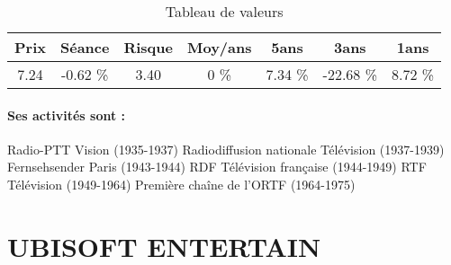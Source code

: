 \documentclass[11pt,a4paper]{report}%
\begin{document}
\begin{table}[H]
  \centering
    \begin{tabular}{|c|c|c|c|c|c|c|}
    \hline
    Prix & Séance & Risque  & Moy/ans & 5ans & 3ans & 1ans \\
    \hline
    7.24 &    -0.62 \%    & 3.40 & 0 \% & 7.34 \% & -22.68 \% & 8.72 \% \\
    \hline
    \end{tabular}%
        \label{tab:table_TF1}%
      \caption{Tableau de valeurs}
\end{table}%

\paragraph{Ses activités sont : } Radio-PTT Vision (1935-1937) Radiodiffusion nationale Télévision (1937-1939) Fernsehsender Paris (1943-1944) RDF Télévision française (1944-1949) RTF Télévision (1949-1964) Première chaîne de l'ORTF (1964-1975) 
    
    \newpage

\section{UBISOFT ENTERTAIN}
\end{document}
